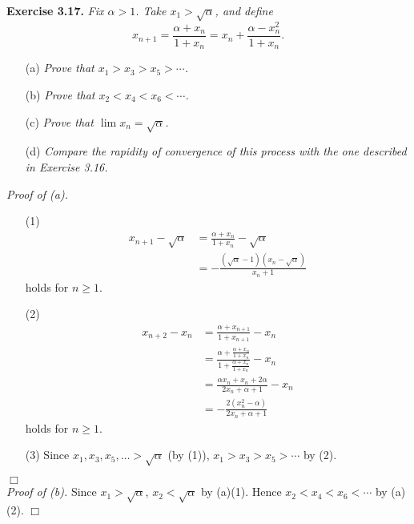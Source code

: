 \documentclass{article}
\begin{document}



\textbf{Exercise 3.17.}
\emph{Fix $\alpha > 1$. Take $x_1 > \sqrt{\alpha}$, and define
$$x_{n+1} = \frac{\alpha+x_n}{1+x_n} = x_n + \frac{\alpha-x_n^2}{1+x_n}.$$}
\begin{enumerate}
\item[(a)]
\emph{Prove that $x_1 > x_3 > x_5 > \cdots$.}
\item[(b)]
\emph{Prove that $x_2 < x_4 < x_6 < \cdots$.}
\item[(c)]
\emph{Prove that $\lim x_n = \sqrt{\alpha}$.}
\item[(d)]
\emph{Compare the rapidity of convergence of this process
with the one described in Exercise 3.16.} \\
\end{enumerate}

\emph{Proof of (a).}
\begin{enumerate}
\item[(1)]
\begin{align*}
  x_{n+1} - \sqrt{\alpha}
  &= \frac{\alpha+x_n}{1+x_n} - \sqrt{\alpha} \\
  &= -\frac{(\sqrt{\alpha}-1)(x_n - \sqrt{\alpha})}{x_n+1}
\end{align*}
holds for $n \geq 1$.
\item[(2)]
\begin{align*}
  x_{n+2} - x_n
  &= \frac{\alpha+x_{n+1}}{1+x_{n+1}} - x_n \\
  &= \frac{\alpha+\frac{\alpha+x_n}{1+x_n}}{1+\frac{\alpha+x_n}{1+x_n}} - x_n \\
  &= \frac{\alpha x_n + x_n + 2\alpha}{2 x_n + \alpha + 1} - x_n \\
  &= -\frac{2 (x_n^2 - \alpha)}{2 x_n + \alpha + 1}
\end{align*}
holds for $n \geq 1$.
\item[(3)]
Since $x_1,x_3,x_5,\ldots > \sqrt{\alpha}$ (by (1)),
$x_1 > x_3 > x_5 > \cdots$ by (2).
\end{enumerate}
$\Box$ \\

\emph{Proof of (b).}
Since $x_1 > \sqrt{\alpha}$, $x_2 < \sqrt{\alpha}$ by (a)(1).
Hence $x_2 < x_4 < x_6 < \cdots$ by (a)(2).
$\Box$ \\
\end{document}
